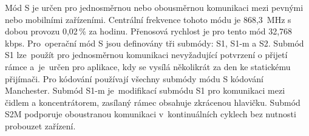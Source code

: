 \begin{table}[!ht]
\centering
\caption{Režimy přenosu WM-Bus protokolu~\cite{WmbusTables}}
\label{TableRezimy}
\end{table}

Mód S je určen pro jednosměrnou nebo obousměrnou komunikaci mezi pevnými nebo mobilními zařízeními. Centrální frekvence tohoto módu je 868,3\, MHz s dobou provozu 0,02\,\% za hodinu. Přenosová rychlost je pro tento mód 32,768\,kbps. Pro~operační mód S jsou definovány tři submódy: S1, S1-m a S2. Submód S1 lze~použít pro jednosměrnou komunikaci nevyžadující potvrzení o přijetí rámce a~je~určen pro aplikace, kdy se vysílá několikrát za den ke statickému přijímači. Pro kódování používají všechny submódy módu S kódování Manchester.  
Submód S1-m je~modifikací submódu S1 pro komunikaci mezi čidlem a koncentrátorem, zasílaný rámec obsahuje zkrácenou hlavičku.
Submód S2M podporuje oboustranou komunikaci v~kontinuálních cyklech bez nutnosti probouzet zařízení.

